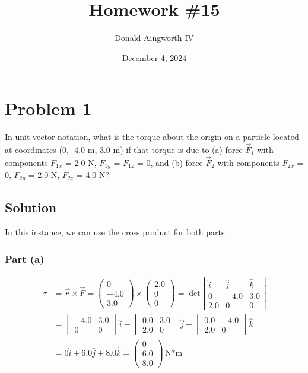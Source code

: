 \documentclass[12pt]{article}
\title{Homework \#15}
\author{Donald Aingworth IV}
\date{December 4, 2024}
\begin{document}

\maketitle

\pagebreak
\section{Problem 1}
In unit-vector notation, what is the torque about the origin on a particle located at coordinates (0, -4.0 m, 3.0 m) if that torque is due to (a) force $\vec{F}_1$ with components $F_{1x}$ = 2.0 N, $F_{1y}$ = $F_{1z}$ = 0, and (b) force $\vec{F}_2$ with components $F_{2x}$ = 0, $F_{2y}$ = 2.0 N, $F_{2z}$ = 4.0 N?

\subsection{Solution}
In this instance, we can use the cross product for both parts. 
\subsubsection{Part (a)}
\begin{align}
    \tau    &=  \vec{r}\times\vec{F}
        =   \left(\begin{matrix} 0 \\ -4.0 \\ 3.0 \end{matrix}\right) \times \left(\begin{matrix} 2.0 \\ 0 \\ 0 \end{matrix}\right)
        =   \det\left|\begin{matrix}
            \hat{i}&\hat{j}&\hat{k}\\
            0   &   -4.0    &   3.0\\
            2.0 &   0       &   0
        \end{matrix}\right|\\
        &=  \begin{vmatrix} -4.0 & 3.0 \\ 0 & 0 \end{vmatrix}\hat{i} - 
            \begin{vmatrix} 0.0 & 3.0 \\ 2.0 & 0 \end{vmatrix}\hat{j} +
            \begin{vmatrix} 0.0 & -4.0 \\ 2.0 & 0 \end{vmatrix}\hat{k}\\
        &=  0\hat{i} + 6.0\hat{j} + 8.0\hat{k}
        =   \boxed{\begin{pmatrix}0\\6.0\\8.0\end{pmatrix}\unit{\newton*\meter}}
\end{align}
\end{document}

